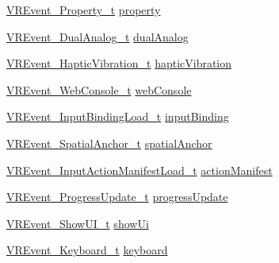 \begin{DoxyCompactItemize}
\item 
\mbox{\hyperlink{struct_valve_1_1_v_r_1_1_v_r_event___property__t}{V\+R\+Event\+\_\+\+Property\+\_\+t}} \mbox{\hyperlink{struct_valve_1_1_v_r_1_1_v_r_event___data__t_a00d0c33eac2c8bad5e3a11945b479787}{property}}
\item 
\mbox{\hyperlink{struct_valve_1_1_v_r_1_1_v_r_event___dual_analog__t}{V\+R\+Event\+\_\+\+Dual\+Analog\+\_\+t}} \mbox{\hyperlink{struct_valve_1_1_v_r_1_1_v_r_event___data__t_abdd8dd35a96c26741c9f48dc0d26a176}{dual\+Analog}}
\item 
\mbox{\hyperlink{struct_valve_1_1_v_r_1_1_v_r_event___haptic_vibration__t}{V\+R\+Event\+\_\+\+Haptic\+Vibration\+\_\+t}} \mbox{\hyperlink{struct_valve_1_1_v_r_1_1_v_r_event___data__t_adba334daf635a6a6ae49d2551a2fbc75}{haptic\+Vibration}}
\item 
\mbox{\hyperlink{struct_valve_1_1_v_r_1_1_v_r_event___web_console__t}{V\+R\+Event\+\_\+\+Web\+Console\+\_\+t}} \mbox{\hyperlink{struct_valve_1_1_v_r_1_1_v_r_event___data__t_a660f3407b42f3e38a177217028ba5230}{web\+Console}}
\item 
\mbox{\hyperlink{struct_valve_1_1_v_r_1_1_v_r_event___input_binding_load__t}{V\+R\+Event\+\_\+\+Input\+Binding\+Load\+\_\+t}} \mbox{\hyperlink{struct_valve_1_1_v_r_1_1_v_r_event___data__t_ad90c6b072feaaf9fc4bd0fc4503b77bd}{input\+Binding}}
\item 
\mbox{\hyperlink{struct_valve_1_1_v_r_1_1_v_r_event___spatial_anchor__t}{V\+R\+Event\+\_\+\+Spatial\+Anchor\+\_\+t}} \mbox{\hyperlink{struct_valve_1_1_v_r_1_1_v_r_event___data__t_a77775804b5531331792d8ed25b4a2c0e}{spatial\+Anchor}}
\item 
\mbox{\hyperlink{struct_valve_1_1_v_r_1_1_v_r_event___input_action_manifest_load__t}{V\+R\+Event\+\_\+\+Input\+Action\+Manifest\+Load\+\_\+t}} \mbox{\hyperlink{struct_valve_1_1_v_r_1_1_v_r_event___data__t_aa43eee933fa03d538da85fe3983a12ad}{action\+Manifest}}
\item 
\mbox{\hyperlink{struct_valve_1_1_v_r_1_1_v_r_event___progress_update__t}{V\+R\+Event\+\_\+\+Progress\+Update\+\_\+t}} \mbox{\hyperlink{struct_valve_1_1_v_r_1_1_v_r_event___data__t_aede75cf09b3c5ab6a0b7cd00b9136c72}{progress\+Update}}
\item 
\mbox{\hyperlink{struct_valve_1_1_v_r_1_1_v_r_event___show_u_i__t}{V\+R\+Event\+\_\+\+Show\+U\+I\+\_\+t}} \mbox{\hyperlink{struct_valve_1_1_v_r_1_1_v_r_event___data__t_a77ca0e431b02fe5bca854593e34fc5fc}{show\+Ui}}
\item 
\mbox{\hyperlink{struct_valve_1_1_v_r_1_1_v_r_event___keyboard__t}{V\+R\+Event\+\_\+\+Keyboard\+\_\+t}} \mbox{\hyperlink{struct_valve_1_1_v_r_1_1_v_r_event___data__t_a866cb4c7fe504f17e4d01c38547a449e}{keyboard}}
\end{DoxyCompactItemize}



